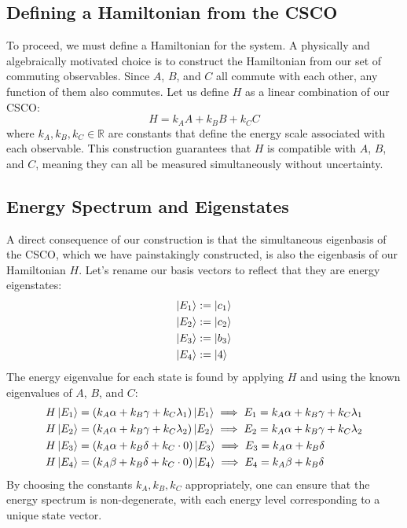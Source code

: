 \documentclass[11pt,a4paper]{article}
\begin{document}
\subsection{Defining a Hamiltonian from the CSCO}

To proceed, we must define a Hamiltonian for the system. A physically and algebraically motivated choice is to construct the Hamiltonian from our set of commuting observables. Since $A$, $B$, and $C$ all commute with each other, any function of them also commutes. Let us define $H$ as a linear combination of our CSCO:
$$
H = k_A A + k_B B + k_C C
$$
where $k_A, k_B, k_C \in \mathbb{R}$ are constants that define the energy scale associated with each observable. This construction guarantees that $H$ is compatible with $A$, $B$, and $C$, meaning they can all be measured simultaneously without uncertainty.

\subsection{Energy Spectrum and Eigenstates}

A direct consequence of our construction is that the simultaneous eigenbasis of the CSCO, which we have painstakingly constructed, is also the eigenbasis of our Hamiltonian $H$. Let's rename our basis vectors to reflect that they are energy eigenstates:
\begin{align*}
    \ket{E_1} &:= \ket{c_1} \\
    \ket{E_2} &:= \ket{c_2} \\
    \ket{E_3} &:= \ket{b_3} \\
    \ket{E_4} &:= \ket{4}
\end{align*}
The energy eigenvalue for each state is found by applying $H$ and using the known eigenvalues of $A$, $B$, and $C$:
\begin{align*}
    H\ket{E_1} &= (k_A\alpha + k_B\gamma + k_C\lambda_1)\ket{E_1} \implies E_1 = k_A\alpha + k_B\gamma + k_C\lambda_1 \\
    H\ket{E_2} &= (k_A\alpha + k_B\gamma + k_C\lambda_2)\ket{E_2} \implies E_2 = k_A\alpha + k_B\gamma + k_C\lambda_2 \\
    H\ket{E_3} &= (k_A\alpha + k_B\delta + k_C \cdot 0)\ket{E_3} \implies E_3 = k_A\alpha + k_B\delta \\
    H\ket{E_4} &= (k_A\beta + k_B\delta + k_C \cdot 0)\ket{E_4} \implies E_4 = k_A\beta + k_B\delta
\end{align*}
By choosing the constants $k_A, k_B, k_C$ appropriately, one can ensure that the energy spectrum is non-degenerate, with each energy level corresponding to a unique state vector.
\end{document}
